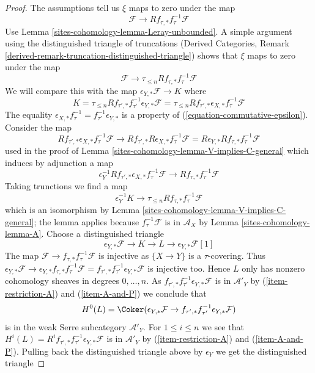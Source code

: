 \begin{proof}
\medskip\noindent
The assumptions tell us $\xi$ maps to zero under the map
$$
\mathcal{F} \longrightarrow Rf_{\tau, *}f_\tau^{-1}\mathcal{F}
$$
Use Lemma \ref{sites-cohomology-lemma-Leray-unbounded}.
A simple argument using the distinguished triangle of truncations
(Derived Categories, Remark
\ref{derived-remark-truncation-distinguished-triangle}) shows that
$\xi$ maps to zero under the map
$$
\mathcal{F} \longrightarrow \tau_{\leq n}Rf_{\tau, *}f_\tau^{-1}\mathcal{F}
$$
We will compare this with the map $\epsilon_{Y, *}\mathcal{F} \to K$
where
$$
K = \tau_{\leq n}Rf_{\tau', *}f_{\tau'}^{-1}\epsilon_{Y, *}\mathcal{F} =
\tau_{\leq n}Rf_{\tau', *}\epsilon_{X, *}f_{\tau}^{-1}\mathcal{F}
$$
The equality
$\epsilon_{X, *} f_\tau^{-1} = f_{\tau'}^{-1} \epsilon_{Y, *}$
is a property of (\ref{equation-commutative-epsilon}). Consider the map
$$
Rf_{\tau', *}\epsilon_{X, *}f_{\tau}^{-1}\mathcal{F} \longrightarrow
Rf_{\tau', *}R\epsilon_{X, *}f_{\tau}^{-1}\mathcal{F} =
R\epsilon_{Y, *}Rf_{\tau, *}f_\tau^{-1}\mathcal{F}
$$
used in the proof of Lemma \ref{sites-cohomology-lemma-V-implies-C-general}
which induces by adjunction a map
$$
\epsilon_Y^{-1} Rf_{\tau', *}\epsilon_{X, *}f_{\tau}^{-1}\mathcal{F} \to
Rf_{\tau, *}f_\tau^{-1}\mathcal{F}
$$
Taking trunctions we find a map
$$
\epsilon_Y^{-1}K
\longrightarrow
\tau_{\leq n}Rf_{\tau, *}f_\tau^{-1}\mathcal{F}
$$
which is an isomorphism by Lemma \ref{sites-cohomology-lemma-V-implies-C-general};
the lemma applies because $f_\tau^{-1}\mathcal{F}$ is in $\mathcal{A}_X$
by Lemma \ref{sites-cohomology-lemma-A}. Choose a distinguished triangle
$$
\epsilon_{Y, *}\mathcal{F} \to K \to L \to \epsilon_{Y, *}\mathcal{F}[1]
$$
The map $\mathcal{F} \to f_{\tau, *}f_\tau^{-1}\mathcal{F}$
is injective as $\{X \to Y\}$ is a $\tau$-covering. Thus
$\epsilon_{Y, *}\mathcal{F} \to
\epsilon_{Y, *}f_{\tau, *}f_\tau^{-1}\mathcal{F} =
f_{\tau', *}f_{\tau'}^{-1}\epsilon_{Y, *}\mathcal{F}$
is injective too.
Hence $L$ only has nonzero cohomology sheaves in degrees $0, \ldots, n$.
As $f_{\tau', *}f_{\tau'}^{-1}\epsilon_{Y, *}\mathcal{F}$
is in $\mathcal{A}'_Y$ by (\ref{item-restriction-A}) and
(\ref{item-A-and-P}) we conclude that
$$
H^0(L) = \Coker(\epsilon_{Y, *}\mathcal{F} \to
f_{\tau', *}f_{\tau'}^{-1}\epsilon_{Y, *}\mathcal{F})
$$
is in the weak Serre subcategory $\mathcal{A}'_Y$. For $1 \leq i \leq n$
we see that $H^i(L) = R^if_{\tau', *}f_{\tau'}^{-1}\epsilon_{Y, *}\mathcal{F}$
is in $\mathcal{A}'_Y$ by (\ref{item-restriction-A}) and
(\ref{item-A-and-P}). Pulling back the distinguished triangle
above by $\epsilon_Y$ we get the distinguished triangle

\end{proof}

